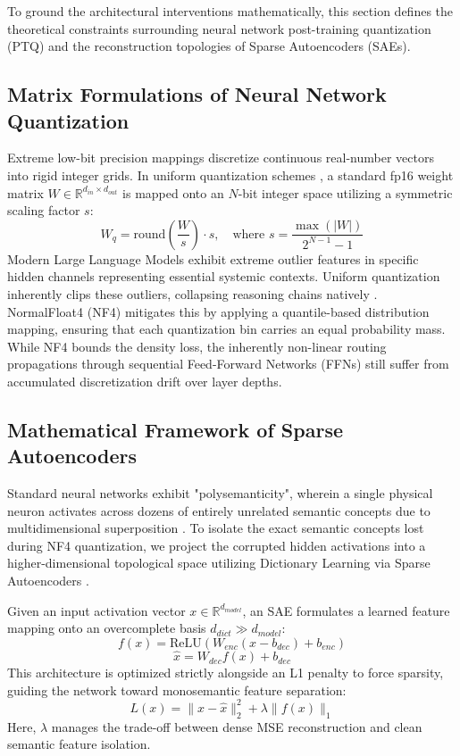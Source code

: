 \documentclass{article}
\begin{document}
To ground the architectural interventions mathematically, this section defines the theoretical constraints surrounding neural network post-training quantization (PTQ) and the reconstruction topologies of Sparse Autoencoders (SAEs).

\subsection{Matrix Formulations of Neural Network Quantization}
Extreme low-bit precision mappings discretize continuous real-number vectors into rigid integer grids. In uniform quantization schemes \cite{jacob2018quantization}, a standard fp16 weight matrix $W \in \mathbb{R}^{d_{in} \times d_{out}}$ is mapped onto an $N$-bit integer space utilizing a symmetric scaling factor $s$:
\begin{equation}
    W_{q} = \text{round}\left( \frac{W}{s} \right) \cdot s, \quad \text{where } s = \frac{\max(|W|)}{2^{N-1} - 1}
\end{equation}
Modern Large Language Models exhibit extreme outlier features in specific hidden channels representing essential systemic contexts. Uniform quantization inherently clips these outliers, collapsing reasoning chains natively \cite{dettmers2022llm}. NormalFloat4 (NF4) \cite{dettmers2023qlora} mitigates this by applying a quantile-based distribution mapping, ensuring that each quantization bin carries an equal probability mass. While NF4 bounds the density loss, the inherently non-linear routing propagations through sequential Feed-Forward Networks (FFNs) still suffer from accumulated discretization drift over layer depths.

\subsection{Mathematical Framework of Sparse Autoencoders}
Standard neural networks exhibit "polysemanticity", wherein a single physical neuron activates across dozens of entirely unrelated semantic concepts due to multidimensional superposition \cite{elhage2021mathematical}. To isolate the exact semantic concepts lost during NF4 quantization, we project the corrupted hidden activations into a higher-dimensional topological space utilizing Dictionary Learning via Sparse Autoencoders \cite{bricken2023towards, cunningham2023sparse}.

Given an input activation vector $x \in \mathbb{R}^{d_{model}}$, an SAE formulates a learned feature mapping onto an overcomplete basis $d_{dict} \gg d_{model}$:
\begin{equation}
    f(x) = \text{ReLU}(W_{enc} (x - b_{dec}) + b_{enc})
\end{equation}
\begin{equation}
    \hat{x} = W_{dec} f(x) + b_{dec}
\end{equation}
This architecture is optimized strictly alongside an L1 penalty to force sparsity, guiding the network toward monosemantic feature separation:
\begin{equation}
    L(x) = \| x - \hat{x} \|_2^2 + \lambda \| f(x) \|_1
\end{equation}
Here, $\lambda$ manages the trade-off between dense MSE reconstruction and clean semantic feature isolation. 
\end{document}
